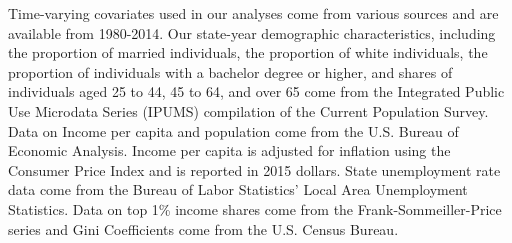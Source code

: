 \documentclass[../Main.tex]{subfiles}
\begin{document}
\indent Time-varying covariates used in our analyses come from various sources and are available from 1980-2014. Our state-year demographic characteristics, including the proportion of married individuals, the proportion of white individuals, the proportion of individuals with a bachelor degree or higher, and shares of individuals aged 25 to 44, 45 to 64, and over 65 come from the Integrated Public Use Microdata Series (IPUMS) compilation of the Current Population Survey. Data on Income per capita and population come from the U.S. Bureau of Economic Analysis. Income per capita is adjusted for inflation using the Consumer Price Index and is reported in 2015 dollars. State unemployment rate data come from the Bureau of Labor Statistics’ Local Area Unemployment Statistics. Data on top 1\% income shares come from the Frank-Sommeiller-Price series \citep{frank2015performance} and Gini Coefficients come from the U.S. Census Bureau.
\end{document}
